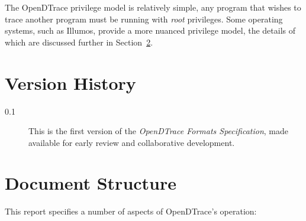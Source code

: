 The OpenDTrace privilege model is relatively simple, any program that
wishes to trace another program must be running with \emph{root}
privileges.  Some operating systems, such as Illumos, provide a more
nuanced privilege model, the details of which are discussed further in
Section~\ref{}.

\section{Version History}

\begin{description}
\item[0.1] This is the first version of the \textit{OpenDTrace Formats
  Specification}, made available for early review and collaborative
  development.
\end{description}

\section{Document Structure}

This report specifies a number of aspects of OpenDTrace's operation:

